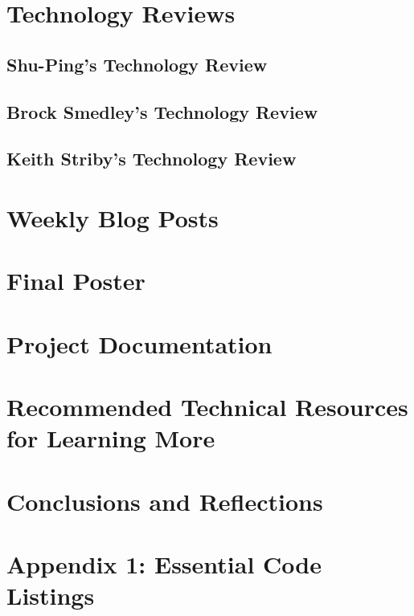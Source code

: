 \documentclass[letterpaper,10pt,serif,draftclsnofoot,onecolumn,compsoc,titlepage]{IEEEtran}
\begin{document}


\newpage

\section{Technology Reviews}

\subsection{Shu-Ping's Technology Review}
%

\newpage

\subsection{Brock Smedley's Technology Review}
%

\newpage

\subsection{Keith Striby's Technology Review}
%

\newpage

\section{Weekly Blog Posts}


\newpage

\section{Final Poster}

\newpage

\section{Project Documentation}

\newpage

\section{Recommended Technical Resources for Learning More}


\newpage

\section{Conclusions and Reflections}

\newpage

\section{Appendix 1: Essential Code Listings}

\nocite{*}
\newpage


\end{document}
